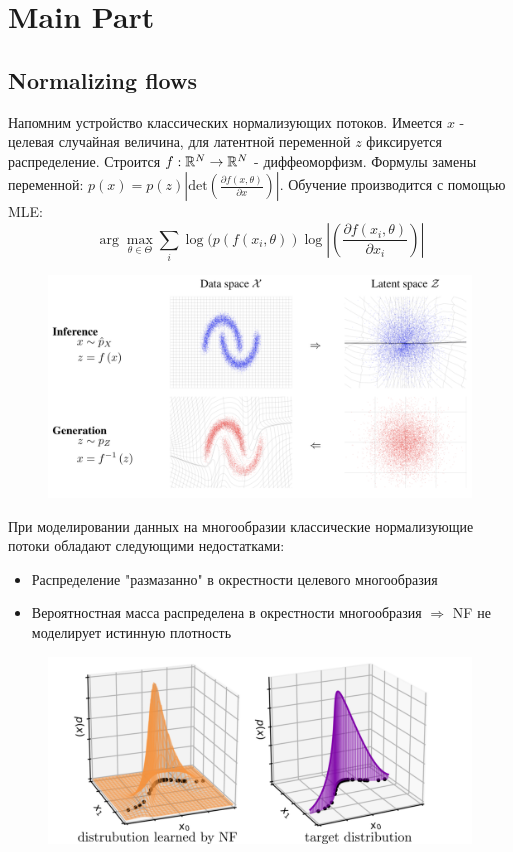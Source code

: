 \section{Main Part}

\subsection{Normalizing flows}

Напомним устройство классических нормализующих потоков. Имеется $x$ - целевая случайная величина, для латентной переменной $z$ фиксируется распределение. Строится $f: \mathbb{R}^N \rightarrow \mathbb{R}^N$ - диффеоморфизм. Формулы замены переменной: $p(x) = p(z) \left|\text{det}\left(\frac{\partial f(x, \theta )}{\partial x}\right)\right|$. Обучение производится с помощью MLE: 
 \vspace{-2mm}$$\arg\max\limits_{\theta \in \Theta} \sum\limits_i \log(p(f(x_i, \theta)) \log \left| \left(\frac{\partial f(x_i, \theta )}{\partial x_i}\right)\right|$$
 \vspace{-5mm}
 \begin{figure}[h]
    \centering
    \includegraphics[width=0.5\linewidth]{chapters/petr_mokrov_s1/figs/flows_how2.png}
\end{figure}

При моделировании данных на многообразии классические нормализующие потоки обладают следующими недостатками: 
\begin{itemize}
    \item Распределение "размазанно" в окрестности целевого многообразия
    \item Вероятностная масса распределена в окрестности многообразия $\Rightarrow$ NF не моделирует истинную плотность
\end{itemize}
\begin{figure}[h]
    \centering
    \includegraphics[width=0.6\linewidth]{chapters/petr_mokrov_s1/figs/nf_on_manifold_with_text.png}
\end{figure}

